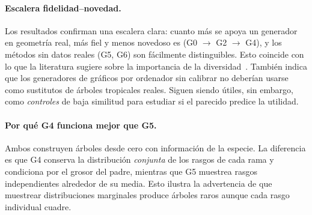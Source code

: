 \documentclass[11pt,a4paper]{article}
\begin{document}
\paragraph{Escalera fidelidad--novedad.} Los resultados confirman una escalera clara: cuanto más se apoya un generador en geometría real, más fiel y menos novedoso es (G0 $\to$ G2 $\to$ G4), y los métodos sin datos reales (G5, G6) son fácilmente distinguibles. Esto coincide con lo que la literatura sugiere sobre la importancia de la diversidad~\cite{she2026scaling}. También indica que los generadores de gráficos por ordenador sin calibrar no deberían usarse como sustitutos de árboles tropicales reales. Siguen siendo útiles, sin embargo, como \emph{controles} de baja similitud para estudiar si el parecido predice la utilidad.

\paragraph{Por qué G4 funciona mejor que G5.} Ambos construyen árboles desde cero con información de la especie. La diferencia es que G4 conserva la distribución \emph{conjunta} de los rasgos de cada rama y condiciona por el grosor del padre, mientras que G5 muestrea rasgos independientes alrededor de su media. Esto ilustra la advertencia de que muestrear distribuciones marginales produce árboles raros aunque cada rasgo individual cuadre.
\end{document}
